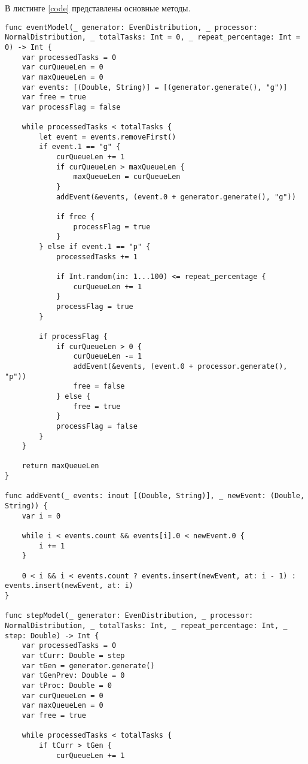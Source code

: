 В листинге \ref{code} представлены основные методы.

\begin{lstlisting}[label=code, caption = Основные методы]
func eventModel(_ generator: EvenDistribution, _ processor: NormalDistribution, _ totalTasks: Int = 0, _ repeat_percentage: Int = 0) -> Int {
    var processedTasks = 0
    var curQueueLen = 0
    var maxQueueLen = 0
    var events: [(Double, String)] = [(generator.generate(), "g")]
    var free = true
    var processFlag = false
    
    while processedTasks < totalTasks {
        let event = events.removeFirst()
        if event.1 == "g" {
            curQueueLen += 1
            if curQueueLen > maxQueueLen {
                maxQueueLen = curQueueLen
            }
            addEvent(&events, (event.0 + generator.generate(), "g"))
            
            if free {
                processFlag = true
            }
        } else if event.1 == "p" {
            processedTasks += 1
            
            if Int.random(in: 1...100) <= repeat_percentage {
                curQueueLen += 1
            }
            processFlag = true
        }
        
        if processFlag {
            if curQueueLen > 0 {
                curQueueLen -= 1
                addEvent(&events, (event.0 + processor.generate(), "p"))
                free = false
            } else {
                free = true
            }
            processFlag = false
        }
    }
    
    return maxQueueLen
}

func addEvent(_ events: inout [(Double, String)], _ newEvent: (Double, String)) {
    var i = 0
    
    while i < events.count && events[i].0 < newEvent.0 {
        i += 1
    }
    
    0 < i && i < events.count ? events.insert(newEvent, at: i - 1) : events.insert(newEvent, at: i)
}

func stepModel(_ generator: EvenDistribution, _ processor: NormalDistribution, _ totalTasks: Int, _ repeat_percentage: Int, _ step: Double) -> Int {
    var processedTasks = 0
    var tCurr: Double = step
    var tGen = generator.generate()
    var tGenPrev: Double = 0
    var tProc: Double = 0
    var curQueueLen = 0
    var maxQueueLen = 0
    var free = true
    
    while processedTasks < totalTasks {
        if tCurr > tGen {
            curQueueLen += 1
            

\end{lstlisting}
